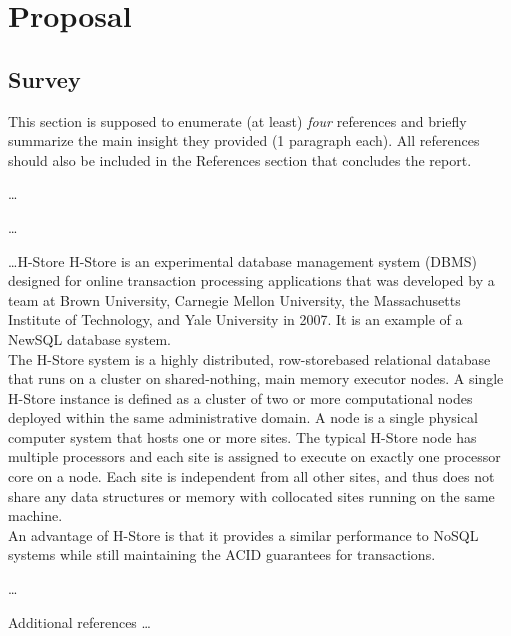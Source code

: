 



\section{Proposal}
\label{sec:cp1-proposal}

\subsection{Survey}
\label{subsec:cp1-survey}

This section is supposed to enumerate (at least) \emph{four} references and briefly summarize the main insight they provided (1 paragraph each). All references should also be included in the References section that concludes the report.

\begin{packed_enum}
   \item \ldots 
   
   \item \ldots
   
   \item \ldots H-Store
   H-Store is an experimental database management system (DBMS) designed for online transaction processing applications that was developed by a team at Brown University, Carnegie Mellon University, the Massachusetts Institute of Technology, and Yale University in 2007. It is an example of a NewSQL database system.\\
   The H-Store system is a highly distributed, row-storebased relational database that runs on a cluster on shared-nothing, main memory executor nodes. A single H-Store instance is defined as a cluster of two  or more computational nodes deployed within the same administrative domain. A node is a single physical computer  system that hosts one or more sites. The typical H-Store node has multiple processors and each site is assigned  to execute on exactly one processor core on a node. Each  site is independent from all other sites, and thus does not share any data structures or memory with collocated sites running on the same machine.\\
   An advantage of H-Store is that it provides a similar performance to NoSQL systems while still maintaining the ACID guarantees for transactions.\\
   
   
   \item \ldots
   \item Additional references \ldots
\end{packed_enum}

